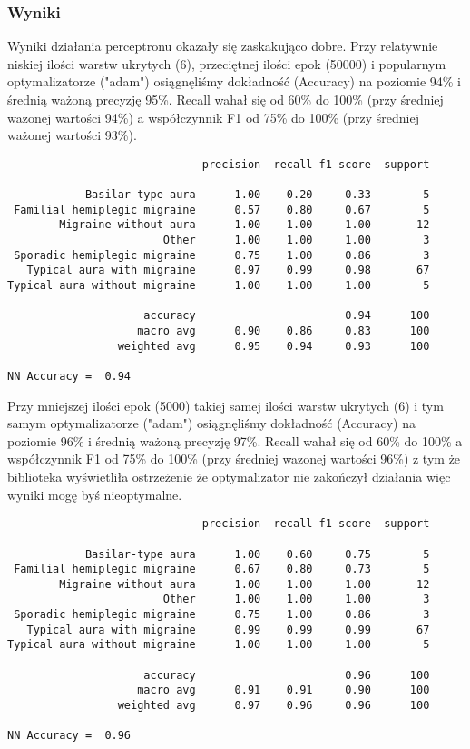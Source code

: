 \subsubsection{Wyniki}
Wyniki działania perceptronu okazały się zaskakująco dobre. Przy relatywnie niskiej ilości warstw ukrytych (6), przeciętnej ilości epok (50000) i popularnym optymalizatorze ("adam") osiągnęliśmy dokładność (Accuracy) na poziomie 94\% i średnią ważoną precyzję 95\%. Recall wahał się od 60\% do 100\% (przy średniej wazonej wartości 94\%) a współczynnik F1 od 75\% do 100\% (przy średniej ważonej wartości 93\%).\\
\begin{verbatim}
                              precision  recall f1-score  support

            Basilar-type aura      1.00    0.20     0.33        5
 Familial hemiplegic migraine      0.57    0.80     0.67        5
        Migraine without aura      1.00    1.00     1.00       12
                        Other      1.00    1.00     1.00        3
 Sporadic hemiplegic migraine      0.75    1.00     0.86        3
   Typical aura with migraine      0.97    0.99     0.98       67
Typical aura without migraine      1.00    1.00     1.00        5

                     accuracy                       0.94      100
                    macro avg      0.90    0.86     0.83      100
                 weighted avg      0.95    0.94     0.93      100

NN Accuracy =  0.94
\end{verbatim}

Przy mniejszej ilości epok (5000) takiej samej ilości warstw ukrytych (6) i tym samym optymalizatorze ("adam") osiągnęliśmy dokładność (Accuracy) na poziomie 96\% i średnią ważoną precyzję 97\%. Recall wahał się od 60\% do 100\% a współczynnik F1 od 75\% do 100\% (przy średniej wazonej wartości 96\%) z tym że biblioteka wyświetliła ostrzeżenie że optymalizator nie zakończył działania więc wyniki mogę byś nieoptymalne.\\

\begin{verbatim}
                              precision  recall f1-score  support

            Basilar-type aura      1.00    0.60     0.75        5
 Familial hemiplegic migraine      0.67    0.80     0.73        5
        Migraine without aura      1.00    1.00     1.00       12
                        Other      1.00    1.00     1.00        3
 Sporadic hemiplegic migraine      0.75    1.00     0.86        3
   Typical aura with migraine      0.99    0.99     0.99       67
Typical aura without migraine      1.00    1.00     1.00        5

                     accuracy                       0.96      100
                    macro avg      0.91    0.91     0.90      100
                 weighted avg      0.97    0.96     0.96      100

NN Accuracy =  0.96
\end{verbatim}

